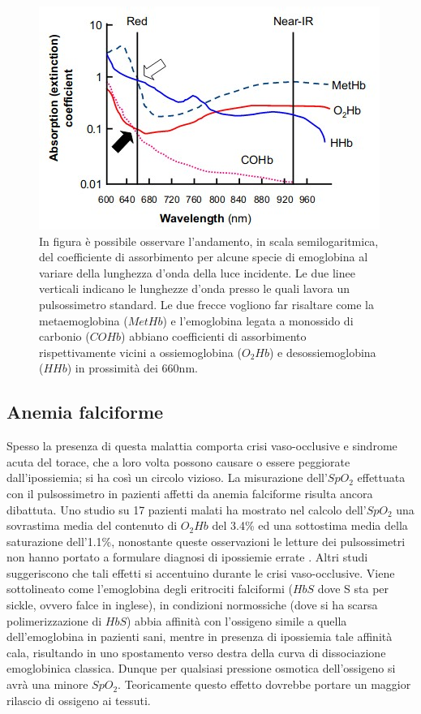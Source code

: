 \documentclass[12pt,a4paper, twoside, openright]{report}
\begin{document}
\begin{figure}[h!]
    \centering
    \includegraphics[width=\textwidth]{multidiss.jpg}
    \caption{In figura è possibile osservare l'andamento, in scala semilogaritmica, del 			 coefficiente di assorbimento per alcune specie di emoglobina al variare 					 della lunghezza d'onda della luce incidente. 
  		     Le due linee verticali indicano le lunghezze d'onda presso le quali lavora 			 un pulsossimetro standard. 
 		     Le due frecce vogliono far risaltare come la metaemoglobina ($MetHb$) e 					 l'emoglobina legata a monossido di carbonio ($COHb$) abbiano coefficienti 					 di assorbimento rispettivamente vicini a ossiemoglobina ($O_2Hb$) e 						 desossiemoglobina ($HHb$) in prossimità dei 660nm.} 
    \label{fig:multidissociation}
\end{figure}


\subsection{Anemia falciforme}

Spesso la presenza di questa malattia comporta crisi vaso-occlusive e sindrome acuta del torace, che a loro volta possono causare o essere peggiorate dall'ipossiemia; si ha così un circolo vizioso. 
La misurazione dell'$SpO_2$ effettuata con il pulsossimetro in pazienti affetti da anemia falciforme risulta ancora dibattuta. 
Uno studio su 17 pazienti malati ha mostrato nel calcolo dell'$SpO_2$ una sovrastima media del contenuto di $O_2Hb$ del 3.4\% ed una sottostima media della saturazione dell'1.1\%, nonostante queste osservazioni le letture dei pulsossimetri non hanno portato a formulare diagnosi di ipossiemie errate \cite{Sickle}. 
Altri studi suggeriscono che tali effetti si accentuino durante le crisi vaso-occlusive. 
Viene sottolineato come l'emoglobina degli eritrociti falciformi ($HbS$ dove S sta per sickle, ovvero falce in inglese), in condizioni normossiche (dove si ha scarsa polimerizzazione di $HbS$) abbia affinità con l'ossigeno simile a quella dell'emoglobina in pazienti sani, mentre in presenza di ipossiemia tale affinità cala, risultando in uno spostamento verso destra della curva di dissociazione emoglobinica classica. 
Dunque per qualsiasi pressione osmotica dell'ossigeno si avrà una minore $SpO_2$. Teoricamente questo effetto dovrebbe portare un maggior rilascio di ossigeno ai tessuti.
\end{document}

